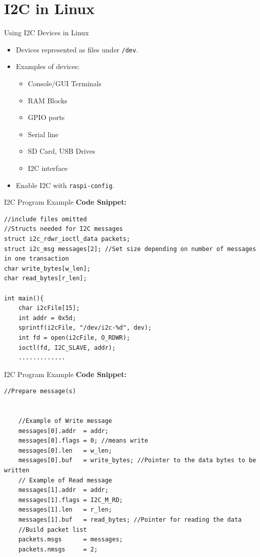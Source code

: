 \section{I2C in Linux}
\begin{frame}{Using I2C Devices in Linux}
    \begin{itemize}
        \item Devices represented as files under \texttt{/dev}.
        \item Examples of devices:
        \begin{itemize}
            \item Console/GUI Terminals
            \item RAM Blocks
            \item GPIO ports
            \item Serial line
            \item SD Card, USB Drives
            \item I2C interface
        \end{itemize}
        \item Enable I2C with \texttt{raspi-config}.
    \end{itemize}
\end{frame}

\begin{frame}[fragile]{I2C Program Example}
    \textbf{Code Snippet:}
    \begin{verbatim}
//include files omitted
//Structs needed for I2C messages
struct i2c_rdwr_ioctl_data packets;
struct i2c_msg messages[2]; //Set size depending on number of messages in one transaction
char write_bytes[w_len];
char read_bytes[r_len];

int main(){
    char i2cFile[15];
    int addr = 0x5d; 
    sprintf(i2cFile, "/dev/i2c-%d", dev);
    int fd = open(i2cFile, O_RDWR); 
    ioctl(fd, I2C_SLAVE, addr);
    .............

    \end{verbatim}

\end{frame}

\begin{frame}[fragile]{I2C Program Example}
    \textbf{Code Snippet:}
    \begin{verbatim}
//Prepare message(s)


    //Example of Write message
    messages[0].addr  = addr;
    messages[0].flags = 0; //means write
    messages[0].len   = w_len;
    messages[0].buf   = write_bytes; //Pointer to the data bytes to be written 
    // Example of Read message
    messages[1].addr  = addr;
    messages[1].flags = I2C_M_RD;
    messages[1].len   = r_len; 
    messages[1].buf   = read_bytes; //Pointer for reading the data
    //Build packet list
    packets.msgs      = messages;
    packets.nmsgs     = 2;

    \end{verbatim}

\end{frame}

